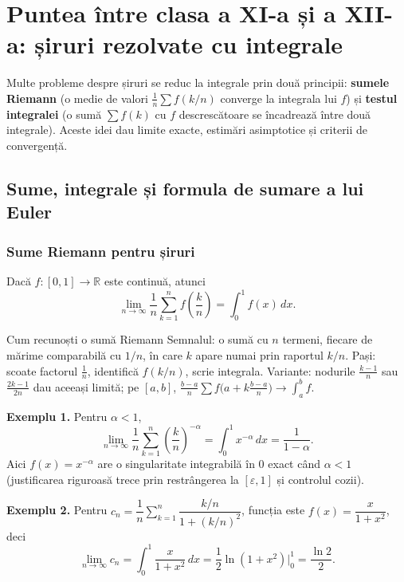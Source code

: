 \chapter{Puntea între clasa a XI-a și a XII-a: șiruri rezolvate cu integrale}

Multe probleme despre șiruri se reduc la integrale prin două principii: \textbf{sumele Riemann} (o medie de valori $\frac1n\sum f(k/n)$ converge la integrala lui $f$) și \textbf{testul integralei} (o sumă $\sum f(k)$ cu $f$ descrescătoare se încadrează între două integrale). Aceste idei dau limite exacte, estimări asimptotice și criterii de convergență.

\section{Sume, integrale și formula de sumare a lui Euler}

\subsection{Sume Riemann pentru șiruri}

\begin{teorema}
Dacă $f:[0,1]\to\mathbb{R}$ este continuă, atunci
\[
\lim_{n\to\infty}\frac1n\sum_{k=1}^{n}f\!\left(\frac{k}{n}\right)=\int_0^1 f(x)\,dx.
\]
\end{teorema}

\begin{tehbox}{Cum recunoști o sumă Riemann}
Semnalul: o sumă cu $n$ termeni, fiecare de mărime comparabilă cu $1/n$, în care $k$ apare numai prin raportul $k/n$. Pași: scoate factorul $\frac1n$, identifică $f(k/n)$, scrie integrala. Variante: nodurile $\frac{k-1}{n}$ sau $\frac{2k-1}{2n}$ dau aceeași limită; pe $[a,b]$, $\frac{b-a}{n}\sum f\big(a+k\frac{b-a}{n}\big)\to\int_a^b f$.
\end{tehbox}

\textbf{Exemplu 1.} Pentru $\alpha<1$,
\[
\lim_{n\to\infty}\frac1n\sum_{k=1}^{n}\left(\frac{k}{n}\right)^{-\alpha}=\int_0^1 x^{-\alpha}\,dx=\frac{1}{1-\alpha}.
\]
Aici $f(x)=x^{-\alpha}$ are o singularitate integrabilă în $0$ exact când $\alpha<1$ (justificarea riguroasă trece prin restrângerea la $[\varepsilon,1]$ și controlul cozii).

\textbf{Exemplu 2.} Pentru
$c_n=\dfrac1n\displaystyle\sum_{k=1}^n \dfrac{k/n}{1+(k/n)^2}$, funcția este $f(x)=\dfrac{x}{1+x^2}$, deci
\[
\lim_{n\to\infty}c_n=\int_0^1\frac{x}{1+x^2}\,dx=\frac12\ln(1+x^2)\Big|_0^1=\frac{\ln 2}{2}.
\]


